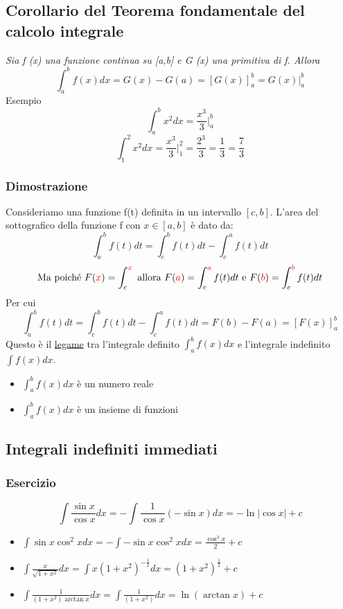 \documentclass{book}
\begin{document}
\subsection{Corollario del Teorema fondamentale del calcolo integrale}
\textit{Sia f (x) una funzione continua su [a,b] e G (x) una primitiva di f. Allora}
\begin{equation*}
	\int^b_a f(x)dx=G(x)-G(a)=[G(x)]^b_a = G(x)\bigg|^b_a
\end{equation*}
Esempio
\begin{equation*}
	\int^b_a x^2 dx=\frac{x^3}{3}\bigg|^b_a
\end{equation*}
\begin{equation*}
	\int^2_1 x^2dx=\frac{x^3}{3}\bigg|^2_1=\frac{2^3}{3}=\frac{1}{3}=\frac{7}{3}
\end{equation*}
\subsubsection{Dimostrazione}
Consideriamo una funzione f(t) definita in un intervallo $[c,b]$. L'area del sottografico della funzione f con $x\in [a,b]$ è dato da:
\begin{equation*}
	\int^b_a f(t)dt=\int^b_c f(t)dt-\int^a_c f(t)dt
\end{equation*}
\begin{equation*}
	\text{Ma poiché } F({\color{red} x})=\int^{{\color{red}x}}_c \text{ allora } F({\color{red} a})=\int^{{\color{red}a}}_c f(t)dt \text{ e } F({\color{red} b})=\int^{{\color{red}b}}_c f(t)dt
\end{equation*}
Per cui
\begin{equation*}
	\int^b_a f(t)dt=\int^b_c f(t)dt-\int^a_c f(t)dt= F(b)-F(a)=[F(x)]^b_a
\end{equation*}
Questo è il \underline{legame} tra l'integrale definito $\int^b_a f(x)dx$ e l'integrale indefinito $\int f(x)dx$.
\begin{itemize}
	\item $\int^b_a f(x)dx$ è un numero reale
	\item $\int^b_a f(x)dx$ è un insieme di funzioni
\end{itemize}
\subsection{Integrali indefiniti immediati}
\subsubsection{Esercizio}
\begin{equation*}
	\int\frac{\sin x}{\cos x}dx=-\int \frac{1}{\cos x} (-\sin x)dx=-\ln |\cos x| + c
\end{equation*}
\begin{itemize}
	\item $\int \sin x \cos^2 x dx=-\int-\sin x \cos^2xdx=\frac{\cos^3x}{2}+c$
	\item $\int \frac{x}{\sqrt{1+x^2}}dx=\int x (1+x^2)^{-\frac{1}{2}}dx=(1+x^2)^\frac{1}{2}+c$
	\item $\int \frac{1}{(1+x^2)\arctan x}dx=\int \frac{1}{(1+x^2)}dx=\ln(\arctan x)+c$
\end{itemize}
\end{document}

